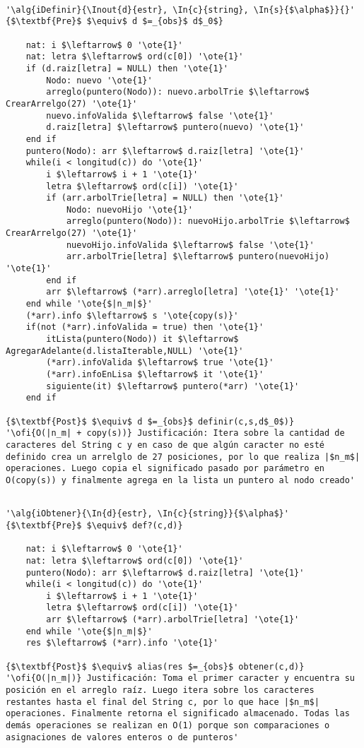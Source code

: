 \begin{lstlisting}[mathescape]

'\alg{iDefinir}{\Inout{d}{estr}, \In{c}{string}, \In{s}{$\alpha$}}{}'
{$\textbf{Pre}$ $\equiv$ d $=_{obs}$ d$_0$}

	nat: i $\leftarrow$ 0 '\ote{1}'
	nat: letra $\leftarrow$ ord(c[0]) '\ote{1}'
	if (d.raiz[letra] = NULL) then '\ote{1}'
		Nodo: nuevo '\ote{1}'
		arreglo(puntero(Nodo)): nuevo.arbolTrie $\leftarrow$ CrearArrelgo(27) '\ote{1}'
		nuevo.infoValida $\leftarrow$ false '\ote{1}'
		d.raiz[letra] $\leftarrow$ puntero(nuevo) '\ote{1}'
	end if
	puntero(Nodo): arr $\leftarrow$ d.raiz[letra] '\ote{1}'
	while(i < longitud(c)) do '\ote{1}'
		i $\leftarrow$ i + 1 '\ote{1}'
		letra $\leftarrow$ ord(c[i]) '\ote{1}'
		if (arr.arbolTrie[letra] = NULL) then '\ote{1}'
			Nodo: nuevoHijo '\ote{1}'
			arreglo(puntero(Nodo)): nuevoHijo.arbolTrie $\leftarrow$ CrearArrelgo(27) '\ote{1}'
			nuevoHijo.infoValida $\leftarrow$ false '\ote{1}'
			arr.arbolTrie[letra] $\leftarrow$ puntero(nuevoHijo) '\ote{1}'	
		end if			
		arr $\leftarrow$ (*arr).arreglo[letra] '\ote{1}' '\ote{1}'
	end while '\ote{$|n_m|$}'
    (*arr).info $\leftarrow$ s '\ote{copy(s)}'
    if(not (*arr).infoValida = true) then '\ote{1}'
    	itLista(puntero(Nodo)) it $\leftarrow$ AgregarAdelante(d.listaIterable,NULL) '\ote{1}'
    	(*arr).infoValida $\leftarrow$ true '\ote{1}'
    	(*arr).infoEnLisa $\leftarrow$ it '\ote{1}'
    	siguiente(it) $\leftarrow$ puntero(*arr) '\ote{1}'
    end if

{$\textbf{Post}$ $\equiv$ d $=_{obs}$ definir(c,s,d$_0$)}    	
'\ofi{O(|n_m| + copy(s))} Justificación: Itera sobre la cantidad de caracteres del String c y en caso de que algún caracter no esté definido crea un arrelglo de 27 posiciones, por lo que realiza |$n_m$| operaciones. Luego copia el significado pasado por parámetro en O(copy(s)) y finalmente agrega en la lista un puntero al nodo creado'

\end{lstlisting}

\begin{lstlisting}[mathescape]

'\alg{iObtener}{\In{d}{estr}, \In{c}{string}}{$\alpha$}'
{$\textbf{Pre}$ $\equiv$ def?(c,d)}

	nat: i $\leftarrow$ 0 '\ote{1}'
	nat: letra $\leftarrow$ ord(c[0]) '\ote{1}'
	puntero(Nodo): arr $\leftarrow$ d.raiz[letra] '\ote{1}'
	while(i < longitud(c)) do '\ote{1}'
		i $\leftarrow$ i + 1 '\ote{1}'
		letra $\leftarrow$ ord(c[i]) '\ote{1}'
		arr $\leftarrow$ (*arr).arbolTrie[letra] '\ote{1}'
	end while '\ote{$|n_m|$}'
	res $\leftarrow$ (*arr).info '\ote{1}'
	
{$\textbf{Post}$ $\equiv$ alias(res $=_{obs}$ obtener(c,d)}
'\ofi{O(|n_m|)} Justificación: Toma el primer caracter y encuentra su posición en el arreglo raíz. Luego itera sobre los caracteres restantes hasta el final del String c, por lo que hace |$n_m$| operaciones. Finalmente retorna el significado almacenado. Todas las demás operaciones se realizan en O(1) porque son comparaciones o asignaciones de valores enteros o de punteros'

\end{lstlisting}

